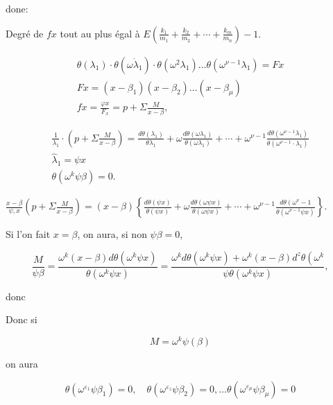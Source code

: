 \documentclass{article}
\begin{document}
done:

Degré de \(f x\) tout au plus égal à \(E\left(\frac{k_{1}}{m_{1}}+\frac{k_{2}}{m_{2}}+\cdots+\frac{k_{m}}{m_{n}}\right)-1\).

\[
\begin{gathered}
\theta\left(\lambda_{1}\right) \cdot \theta\left(\omega \dot{\lambda}_{1}\right) \cdot \theta\left(\omega^{2} \lambda_{1}\right) \ldots \theta\left(\omega^{\nu-1} \lambda_{1}\right)=F x \\
F x=\left(x-\beta_{1}\right)\left(x-\beta_{2}\right) \ldots\left(x-\beta_{\mu}\right) \\
f x=\frac{\varphi x}{F_{x}}=p+\Sigma \frac{M}{x-\beta},
\end{gathered}
\]

\[
\begin{gathered}
\frac{1}{\lambda_{1}} \cdot\left(p+\Sigma \frac{M}{x-\beta}\right)=\frac{d \theta\left(\lambda_{1}\right)}{\theta \lambda_{1}}+\omega \frac{d \theta\left(\omega \lambda_{1}\right)}{\theta\left(\omega \lambda_{1}\right)}+\cdots+\omega^{\nu-1} \frac{d \theta\left(\omega^{\nu-1} \lambda_{1}\right)}{\theta\left(\omega^{\nu-1} \cdot \lambda_{1}\right)} \\
\hat{\lambda}_{1}=\psi x \\
\theta\left(\omega^{k} \psi \beta\right)=0 .
\end{gathered}
\]

\(\frac{x-\beta}{\psi, x}\left(p+\Sigma \frac{M}{x-\beta}\right)=(x-\beta)\left\{\frac{d \theta(\psi x)}{\theta(\psi x)}+\omega \frac{d \theta(\omega \psi x)}{\theta(\omega \psi x)}+\cdots+\omega^{\nu-1} \frac{d \theta\left(\omega^{\nu}-1\right.}{\theta\left(\omega^{\nu-1} \psi x\right)}\right\}\).

Si l'on fait \(x=\beta\), on aura, si non \(\psi \beta=0\),

\[
\frac{M}{\psi \beta}=\frac{\omega^{k}(x-\beta) d \theta\left(\omega^{k} \psi x\right)}{\theta\left(\omega^{k} \psi x\right)}=\frac{\omega^{k} d \theta\left(\omega^{k} \psi x\right)+\omega^{k}(x-\beta) d^{z} \theta\left(\omega^{k}\right.}{\psi \theta\left(\omega^{k} \psi x\right)},
\]

donc

Donc si

\[
M=\omega^{k} \psi(\beta)
\]

on aura

\[
\theta\left(\omega^{\varepsilon_{1}} \psi \beta_{1}\right)=0, \quad \theta\left(\omega^{\varepsilon_{z}} \psi \beta_{2}\right)=0, \ldots \theta\left(\omega^{\varepsilon_{\mu}} \psi \beta_{\mu}\right)=0
\]
\end{document}
